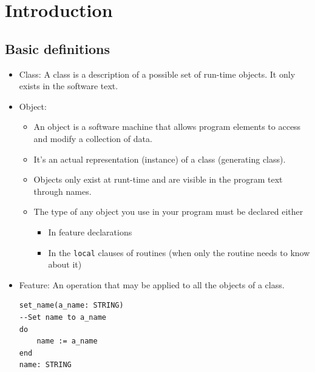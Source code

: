 \documentclass[a4paper]{article}
\newcommand{\inline}[1]{\lstinline!#1!}%
\begin{document}
\section{Introduction}
\subsection{Basic definitions}
\begin{itemize}
\item Class: A class is a description of a possible set of run-time objects. It only exists in the software text.
\item Object: 
\begin{itemize}
\item An object is a software machine that allows program elements to access and modify a collection of data.
\item  It's an actual representation (instance) of a class (generating class). 
\item Objects only exist at runt-time and are visible in the program text through names.
\item The type of any object you use in your program must be declared either
\begin{itemize}
\item In feature declarations
\item In the \inline{local} clauses of routines (when only the routine needs to know about it)
\end{itemize}
\end{itemize}
\item Feature: An operation that may be applied to all the objects of a class.

\begin{lstlisting}
set_name(a_name: STRING)
--Set name to a_name
do
	name := a_name
end
name: STRING
\end{lstlisting}


\end{itemize}
\end{document}
